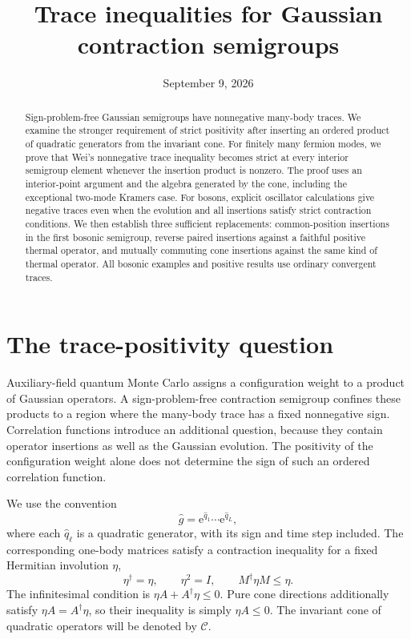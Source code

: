 \documentclass[11pt,a4paper]{article}
\title{Trace inequalities for Gaussian contraction semigroups}
\author{}
\date{September 9, 2026}
\newcommand{\ee}{\mathrm e}
\newcommand{\mc}[1]{\mathcal{#1}}
\theoremstyle{remark}
\numberwithin{equation}{section}
\begin{document}
\maketitle
\vspace{-1.5em}
\begin{abstract}
Sign-problem-free Gaussian semigroups have nonnegative many-body traces. We
examine the stronger requirement of strict positivity after inserting an
ordered product of quadratic generators from the invariant cone. For finitely
many fermion modes, we prove that Wei's nonnegative trace inequality becomes
strict at every interior semigroup element whenever the insertion product is
nonzero. The proof uses an interior-point argument and the algebra generated
by the cone, including the exceptional two-mode Kramers case. For bosons,
explicit oscillator calculations give negative traces even when the evolution
and all insertions satisfy strict contraction conditions. We then establish
three sufficient replacements: common-position insertions in the first
bosonic semigroup, reverse paired insertions against a faithful positive
thermal operator, and mutually commuting cone insertions against the same
kind of thermal operator. All bosonic examples and positive results use
ordinary convergent traces.
\end{abstract}

\section{The trace-positivity question}
\label{sec:question}

Auxiliary-field quantum Monte Carlo assigns a configuration weight to a
product of Gaussian operators. A sign-problem-free contraction semigroup
confines these products to a region where the many-body trace has a fixed
nonnegative sign. Correlation functions introduce an additional question,
because they contain operator insertions as well as the Gaussian evolution.
The positivity of the configuration weight alone does not determine the sign
of such an ordered correlation function.

We use the convention
\begin{equation}
\hat g=\ee^{\hat q_1}\cdots\ee^{\hat q_L},
\label{eq:gaussian_product}
\end{equation}
where each \(\hat q_\ell\) is a quadratic generator, with its sign and time
step included. The corresponding one-body matrices satisfy a contraction
inequality for a fixed Hermitian involution \(\eta\),
\begin{equation}
\eta^\dagger=\eta,\qquad \eta^2=I,\qquad
M^\dagger\eta M\leq\eta.
\label{eq:finite_contraction}
\end{equation}
The infinitesimal condition is
\(\eta A+A^\dagger\eta\leq0\). Pure cone directions additionally satisfy
\(\eta A=A^\dagger\eta\), so their inequality is simply \(\eta A\leq0\).
The invariant cone of quadratic operators will be denoted by \(\mc C\).
\end{document}
